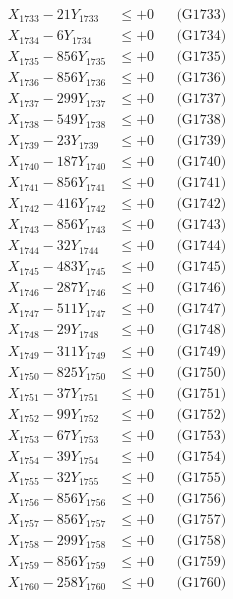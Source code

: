 \documentclass[a4paper,10pt]{article}
\begin{document}
{\begin{align}
X_{1733} - 21Y_{1733} &\leq +0 && \text{(G1733)} \\
X_{1734} - 6Y_{1734} &\leq +0 && \text{(G1734)} \\
X_{1735} - 856Y_{1735} &\leq +0 && \text{(G1735)} \\
X_{1736} - 856Y_{1736} &\leq +0 && \text{(G1736)} \\
X_{1737} - 299Y_{1737} &\leq +0 && \text{(G1737)} \\
X_{1738} - 549Y_{1738} &\leq +0 && \text{(G1738)} \\
X_{1739} - 23Y_{1739} &\leq +0 && \text{(G1739)} \\
X_{1740} - 187Y_{1740} &\leq +0 && \text{(G1740)} \\
\allowbreak
X_{1741} - 856Y_{1741} &\leq +0 && \text{(G1741)} \\
X_{1742} - 416Y_{1742} &\leq +0 && \text{(G1742)} \\
X_{1743} - 856Y_{1743} &\leq +0 && \text{(G1743)} \\
X_{1744} - 32Y_{1744} &\leq +0 && \text{(G1744)} \\
X_{1745} - 483Y_{1745} &\leq +0 && \text{(G1745)} \\
X_{1746} - 287Y_{1746} &\leq +0 && \text{(G1746)} \\
X_{1747} - 511Y_{1747} &\leq +0 && \text{(G1747)} \\
X_{1748} - 29Y_{1748} &\leq +0 && \text{(G1748)} \\
X_{1749} - 311Y_{1749} &\leq +0 && \text{(G1749)} \\
X_{1750} - 825Y_{1750} &\leq +0 && \text{(G1750)} \\
\allowbreak
X_{1751} - 37Y_{1751} &\leq +0 && \text{(G1751)} \\
X_{1752} - 99Y_{1752} &\leq +0 && \text{(G1752)} \\
X_{1753} - 67Y_{1753} &\leq +0 && \text{(G1753)} \\
X_{1754} - 39Y_{1754} &\leq +0 && \text{(G1754)} \\
X_{1755} - 32Y_{1755} &\leq +0 && \text{(G1755)} \\
X_{1756} - 856Y_{1756} &\leq +0 && \text{(G1756)} \\
X_{1757} - 856Y_{1757} &\leq +0 && \text{(G1757)} \\
X_{1758} - 299Y_{1758} &\leq +0 && \text{(G1758)} \\
X_{1759} - 856Y_{1759} &\leq +0 && \text{(G1759)} \\
X_{1760} - 258Y_{1760} &\leq +0 && \text{(G1760)} \\

\end{align}}
\end{document}
